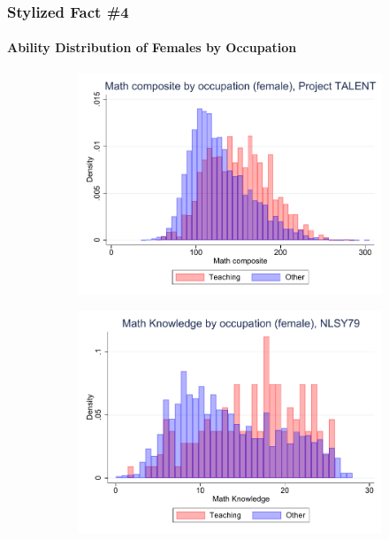 \documentclass[11pt]{beamer}
\begin{document}
	\begin{frame}
		\frametitle{Stylized Fact \#4}
		\framesubtitle{Ability Distribution of Females by Occupation}
		\begin{adjustwidth}{2em}{2em}
			\vfill
			\begin{figure}[ht!]
				\begin{subfigure}[b]{0.27\textwidth}
					\centering
					\includegraphics[width=\textwidth]{plots/TALENT_math_occ_no_norm_female_no_lf.pdf}
				\end{subfigure}
				\hfill
				\begin{subfigure}[b]{0.27\textwidth}
					\centering
					\includegraphics[width=\textwidth]{plots/nlsy79_mk_occ_no_norm_female_no_lf.pdf}
				\end{subfigure}

\end{figure}
\end{adjustwidth}
\end{frame}
\end{document}
